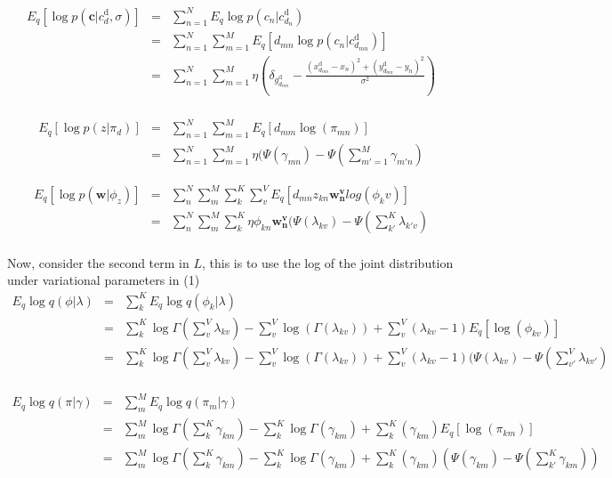 \documentclass[]{article}
\begin{document}
\begin{eqnarray}
E_q [\log p(\boldsymbol{c} | c^{\mathrm{d}}_d, \sigma)] 
&=& \sum\limits_{n=1}^{N} E_q \log p(c_n | c_{d_n}^{\mathrm{d}}) \\
&=& \sum\limits_{n=1}^{N} \sum\limits_{m=1}^{M} E_q [d_{mn} \log p(c_n | c_{d_{mn}}^{\mathrm{d}})]  \\
&=& \sum\limits_{n=1}^{N} \sum\limits_{m=1}^{M} \eta (\delta_{g_{d_{mn}}^{\mathrm{d}}} - \frac{(x_{d_{mn}}^{\mathrm{d}} - x_n)^2 + (y_{d_{mn}}^{\mathrm{d}} - y_n)^2}{\sigma^2})\\
\end{eqnarray}

\begin{eqnarray}
E_q[\log p(z | \pi_d)]
&=& \sum\limits_{n=1}^{N} \sum\limits_{m=1}^{M} E_q[d_{mm} \log(\pi_{mn})] \\
&=& \sum\limits_{n=1}^{N} \sum\limits_{m=1}^{M} \eta (\Psi(\gamma_{mn}) - \Psi(\sum\limits_{m'=1}^{M} \gamma_{m'n})
\end{eqnarray}

\begin{eqnarray}
E_q [\log p(\boldsymbol{w} | \phi_z)]
&=& \sum\limits_{n}^{N} \sum\limits_{m}^{M} \sum\limits_{k}^{K} \sum\limits_{v}^{V} E_q[d_{mn} z_{kn} \boldsymbol{w_n^v} log(\phi_kv)] \\
&=& \sum\limits_{n}^{N} \sum\limits_{m}^{M} \sum\limits_{k}^{K} \eta \phi_{kn} \boldsymbol{w_n^v} (\Psi(\lambda_{kv}) - \Psi(\sum\limits_{k'}^{K} \lambda_{k'v}) \\
\end{eqnarray}

Now, consider the second term in $L$, this is to use the log of the joint distribution under variational parameters in (1)
\begin{eqnarray}
E_q \log q(\phi | \lambda) 
&=& \sum\limits_{k}^{K} E_q \log q(\phi_k | \lambda) \\
&=& \sum\limits_{k}^{K} \log \Gamma(\sum\limits_{v}^{V} \lambda_{kv}) - \sum\limits_{v}^{V} \log(\Gamma(\lambda_{kv})) + \sum\limits_{v}^{V}(\lambda_{kv}-1) E_q[\log(\phi_{kv})] \\
&=& \sum\limits_{k}^{K} \log \Gamma(\sum\limits_{v}^{V} \lambda_{kv}) - \sum\limits_{v}^{V} \log(\Gamma(\lambda_{kv})) + \sum\limits_{v}^{V}(\lambda_{kv}-1)(\Psi(\lambda_{kv}) - \Psi(\sum\limits_{v'}^{V} \lambda_{kv'}) \\
\end{eqnarray}

\begin{eqnarray}
E_q \log q(\pi | \gamma) 
&=& \sum\limits_{m}^{M} E_q \log q(\pi_m | \gamma) \\
&=& \sum\limits_{m}^{M} \log \Gamma(\sum\limits_{k}^{K} \gamma_{km}) - \sum\limits_{k}^{K} \log \Gamma(\gamma_{km}) + \sum\limits_{k}^{K}(\gamma_{km})E_q[\log(\pi_{km})] \\
&=& \sum\limits_{m}^{M} \log \Gamma(\sum\limits_{k}^{K} \gamma_{km}) - \sum\limits_{k}^{K} \log \Gamma(\gamma_{km}) + \sum\limits_{k}^{K}(\gamma_{km})(\Psi(\gamma_{km}) - \Psi(\sum\limits_{k'}^{K} \gamma_{km})) \\
\end{eqnarray}
\end{document}
